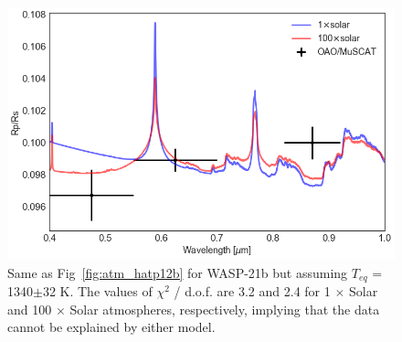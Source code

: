 \begin{figure}
\centering
\includegraphics[width=12cm]{wasp21/atm_model.png}
\caption{Same as Fig~\ref{fig:atm_hatp12b} for WASP-21b but assuming $T_{eq}$ = 1340$\pm$32 K. The values of $\chi^2$ / d.o.f. are 3.2 and 2.4 for 1 $\times$ Solar and 100 $\times$ Solar atmospheres, respectively, implying that the data cannot be explained by either model.}
\label{fig:atm_wasp21b}
\end{figure}

